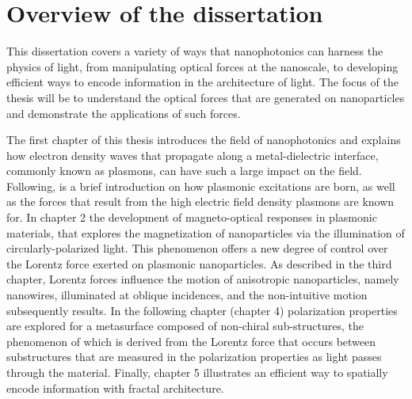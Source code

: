 \section{Overview of the dissertation}
This dissertation covers a variety of ways that nanophotonics can harness the physics of light, from manipulating optical forces at the nanoscale, to developing efficient ways to encode information in the architecture of light. The focus of the thesis will be to understand the optical forces that are generated on nanoparticles and demonstrate the applications of such forces. 

The first chapter of this thesis introduces the field of nanophotonics and explains how electron density waves that propagate along a metal-dielectric interface, commonly known as plasmons, can have such a large impact on the field. Following, is a brief introduction on how plasmonic excitations are born, as well as the forces that result from the high electric field density plasmons are known for.
In chapter 2 the development of magneto-optical responses in plasmonic materials, that explores the magnetization of nanoparticles via the illumination of circularly-polarized light. This phenomenon offers a new degree of control over the Lorentz force exerted on plasmonic nanoparticles. As described in the third chapter, Lorentz forces influence the motion of anisotropic nanoparticles, namely nanowires, illuminated at oblique incidences, and the non-intuitive motion subsequently results. In the following chapter (chapter 4) polarization properties are explored for a metasurface composed of non-chiral sub-structures, the phenomenon of which is derived from the Lorentz force that occurs between substructures that are measured in the polarization properties as light passes through the material. Finally, chapter 5 illustrates an efficient way to spatially encode information with fractal architecture.


